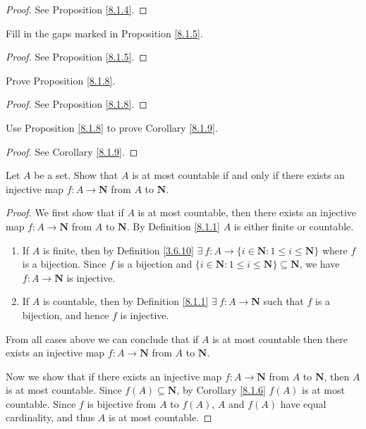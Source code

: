 \begin{proof}
    See Proposition \ref{8.1.4}.
\end{proof}

\begin{exercise}\label{ex 8.1.3}
    Fill in the gaps marked in Proposition \ref{8.1.5}.
\end{exercise}

\begin{proof}
    See Proposition \ref{8.1.5}.
\end{proof}

\begin{exercise}\label{ex 8.1.4}
    Prove Proposition \ref{8.1.8}.
\end{exercise}

\begin{proof}
    See Proposition \ref{8.1.8}.
\end{proof}

\begin{exercise}\label{ex 8.1.5}
    Use Proposition \ref{8.1.8} to prove Corollary \ref{8.1.9}.
\end{exercise}

\begin{proof}
    See Corollary \ref{8.1.9}.
\end{proof}

\begin{exercise}\label{ex 8.1.6}
    Let \(A\) be a set.
    Show that \(A\) is at most countable if and only if there exists an injective map \(f : A \to \mathbf{N}\) from \(A\) to \(\mathbf{N}\).
\end{exercise}

\begin{proof}
    We first show that if \(A\) is at most countable, then there exists an injective map \(f : A \to \mathbf{N}\) from \(A\) to \(\mathbf{N}\).
    By Definition \ref{8.1.1} \(A\) is either finite or countable.
    \begin{enumerate}
        \item If \(A\) is finite, then by Definition \ref{3.6.10} \(\exists\ f : A \to \{i \in \mathbf{N} : 1 \leq i \leq \mathbf{N}\}\) where \(f\) is a bijection.
              Since \(f\) is a bijection and \(\{i \in \mathbf{N} : 1 \leq i \leq \mathbf{N}\} \subseteq \mathbf{N}\), we have \(f : A \to \mathbf{N}\) is injective.
        \item If \(A\) is countable, then by Definition \ref{8.1.1} \(\exists\ f : A \to \mathbf{N}\) such that \(f\) is a bijection, and hence \(f\) is injective.
    \end{enumerate}
    From all cases above we can conclude that if \(A\) is at most countable then there exists an injective map \(f : A \to \mathbf{N}\) from \(A\) to \(\mathbf{N}\).

    Now we show that if there exists an injective map \(f : A \to \mathbf{N}\) from \(A\) to \(\mathbf{N}\), then \(A\) is at most countable.
    Since \(f(A) \subseteq \mathbf{N}\), by Corollary \ref{8.1.6} \(f(A)\) is at most countable.
    Since \(f\) is bijective from \(A\) to \(f(A)\), \(A\) and \(f(A)\) have equal cardinality, and thus \(A\) is at most countable.
\end{proof}

